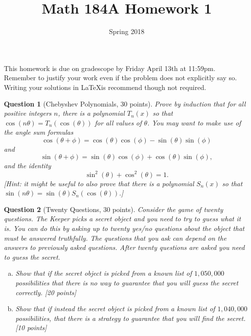 \documentclass{article}
\title{Math 184A Homework 1}
\date{Spring 2018}
\newtheorem{ques}{Question}
\begin{document}
\maketitle

This homework is due on gradescope by Friday April 13th at 11:59pm. Remember to justify your work even if the problem does not explicitly say so. Writing your solutions in \LaTeX is recommend though not required.

\begin{ques}[Chebyshev Polynomials, 30 points]
Prove by induction that for all positive integers $n$, there is a polynomial $T_n(x)$ so that $\cos(n\theta) = T_n(\cos(\theta))$ for all values of $\theta$. You may want to make use of the angle sum formulas
$$
\cos(\theta+\phi) = \cos(\theta)\cos(\phi)-\sin(\theta)\sin(\phi)
$$
and
$$
\sin(\theta+\phi)=\sin(\theta)\cos(\phi)+\cos(\theta)\sin(\phi),
$$
and the identity
$$
\sin^2(\theta)+\cos^2(\theta)=1.
$$
[Hint: it might be useful to also prove that there is a polynomial $S_n(x)$ so that $\sin(n\theta)= \sin(\theta)S_n(\cos(\theta))$.]
\end{ques}

\begin{ques}[Twenty Questions, 30 points]
Consider the game of twenty questions. The Keeper picks a secret object and you need to try to guess what it is. You can do this by asking up to twenty yes/no questions about the object that must be answered truthfully. The questions that you ask can depend on the answers to previously asked questions. After twenty questions are asked you need to guess the secret.
\begin{enumerate}[(a)]
\item Show that if the secret object is picked from a known list of $1,050,000$ possibilities that there is no way to guarantee that you will guess the secret correctly. [20 points]
\item Show that if instead the secret object is picked from a known list of $1,040,000$ possibilities, that there is a strategy to guarantee that you will find the secret. [10 points]
\end{enumerate}
\end{ques}
\end{document}
